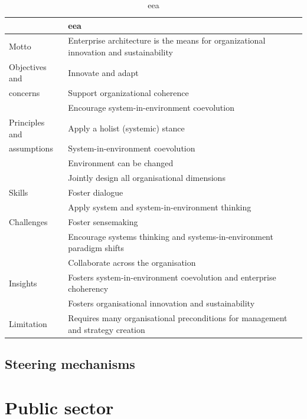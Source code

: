 \begin{longtable}{p{}p{}}
	\toprule
	& \textbf{\acrlong{eea}} \\ \midrule%
	\endhead%
	\hline
	\caption{\acrlong{eea}}
	\label{tab:eaeea}	
	\endfoot%
	Motto    		& Enterprise architecture is the means for organizational innovation and sustainability \\
	Objectives and 	& Innovate and adapt    \\
	concerns		& Support organizational coherence \\
					& Encourage system-in-environment coevolution \\
	Principles and  & Apply a holist (systemic) stance \\
	assumptions		& System-in-environment coevolution  \\
					& Environment can be changed \\
					& Jointly design all organisational dimensions \\
	Skills 			& Foster dialogue \\
					& Apply system and system-in-environment thinking \\
	Challenges		& Foster sensemaking \\
					& Encourage systems thinking and systems-in-environment paradigm shifts \\
					& Collaborate across the organisation \\
	Insights		& Fosters system-in-environment coevolution and enterprise choherency \\
					& Fosters organisational innovation and sustainability \\
	Limitation		& Requires many organisational preconditions for management and strategy creation \\
	\bottomrule
\end{longtable}

\subsection{Steering mechanisms}
\label{sub:tbeasteering}

\section{Public sector}
\label{sec:tbpsmarket}



